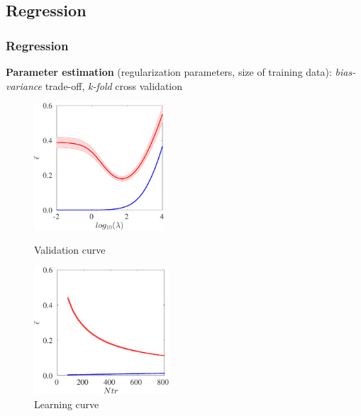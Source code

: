 \documentclass{beamer}
\begin{document}
\subsection{Regression}
\begin{frame}
\frametitle{Regression}		
	\begin{tcolorbox}[colback=red!5!white,colframe=red!75!black]	
		\textbf{Parameter estimation} (regularization parameters, size of training data): \emph{bias-variance} trade-off, \textit{k-fold} cross validation 
 	\end{tcolorbox}
 	
	\begin{figure}
	\centering
	\begin{minipage}{.4\textwidth}
	  \includegraphics[height=4.75cm]{./figures/Regression/RR_validationcurve.eps}
	  \caption{Validation curve}
	\end{minipage}
	\hfil
	\begin{minipage}{.4\textwidth}
	  \includegraphics[height=4.75cm]{./figures/Regression/RR_learningcurve.eps}
	  \caption{Learning curve}	
	\end{minipage}
	\end{figure}
\end{frame}	
\end{document}
